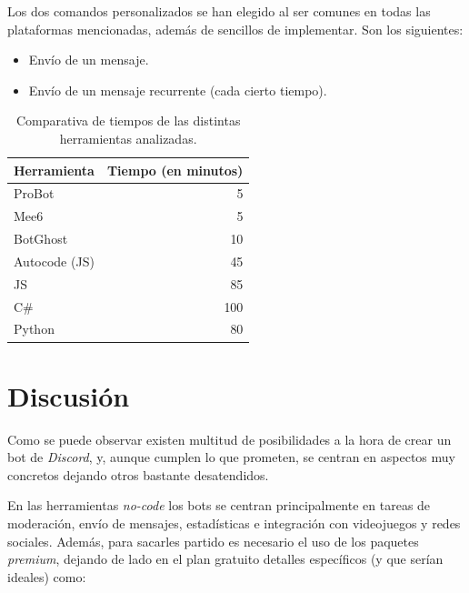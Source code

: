 Los dos comandos personalizados se han elegido al ser comunes en todas las plataformas mencionadas, además de sencillos de implementar. Son los siguientes:

\begin{itemize}
	\item Envío de un mensaje.
	\item Envío de un mensaje recurrente (cada cierto tiempo).
\end{itemize}

\FloatBarrier
\begin{table}[h]
    \centering
    \def\arraystretch{1.25}
    \begin{adjustbox}{max width=\textwidth}
    \begin{tabularx}{200px}{|l|R|}
    \hline
        \textbf{Herramienta} & \textbf{Tiempo (en minutos)} \\ \hline
    \hline
        ProBot & 5 \\ \hline
        Mee6 & 5 \\ \hline
        BotGhost & 10 \\ \hline
    \hline
        Autocode (JS) & 45 \\ \hline
    \hline
        JS & 85 \\ \hline
        C\# & 100 \\ \hline
        Python & 80 \\ \hline
    \end{tabularx}
    \end{adjustbox}
    \caption{Comparativa de tiempos de las distintas herramientas analizadas.}
\end{table}
\FloatBarrier

\section{Discusión}

Como se puede observar existen multitud de posibilidades a la hora de crear un bot de \textit{Discord}, y, aunque cumplen lo que prometen, se centran en aspectos muy concretos dejando otros bastante desatendidos.

En las herramientas \textit{no-code} los bots se centran principalmente en tareas de moderación, envío de mensajes, estadísticas e integración con videojuegos y redes sociales. Además, para sacarles partido es necesario el uso de los paquetes \textit{premium}, dejando de lado en el plan gratuito detalles específicos (y que serían ideales) como:

